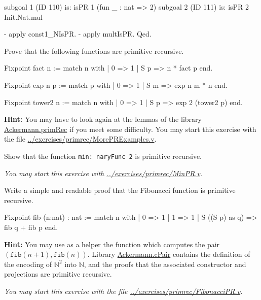 \begin{Coqanswer}
subgoal 1 (ID 110) is:
 isPR 1 (fun _ : nat => 2)
subgoal 2 (ID 111) is:
 isPR 2 Init.Nat.mul
\end{Coqanswer}

 \begin{Coqsrc}
  - apply const1_NIsPR.
  - apply multIsPR.
Qed.
\end{Coqsrc}

\begin{exercise}
Prove that the following functions are primitive recursive. 

\begin{Coqsrc}
Fixpoint fact n :=
  match n with 
          | 0 => 1
          | S p  => n * fact p
  end.

Fixpoint exp n p :=
  match p with
  | 0 => 1
  | S m =>  exp n m * n
  end.

Fixpoint tower2 n :=
  match n with
  | 0 => 1
  | S p => exp 2 (tower2 p)
  end.
\end{Coqsrc}



\textbf{Hint:} You may have to look again at the lemmas of the library
\href{../theories/html/hydras.Ackermann.primRec.html}{Ackermann.primRec} if you meet some difficulty.
You may start this exercise with the file
\url{../exercises/primrec/MorePRExamples.v}.
\end{exercise}



\begin{exercise}
Show that the function \texttt{min: naryFunc\,2} is primitive
recursive.

\emph{You may start this exercise with
\url{../exercises/primrec/MinPR.v}.}

\end{exercise}


\begin{exercise}
Write a simple and readable proof that the Fibonacci function is primitive recursive.


\begin{Coqsrc}
Fixpoint fib (n:nat) : nat :=
  match n with
  | 0 => 1
  | 1 => 1
  | S ((S p) as q) => fib q + fib p
  end.
\end{Coqsrc}

\textbf{Hint:}  You may use as a helper the function which computes the pair 
$(\texttt{fib}(n+1),\texttt{fib}(n))$. 
Library \href{../theories/html/hydras.Ackermann.cPair.html}{Ackermann.cPair} contains
the definition of the encoding of $\mathbb{N}^2$ into $\mathbb{N}$, and the proofs that 
the associated constructor and projections are primitive recursive.


\emph{You may start this exercise with the file
\url{../exercises/primrec/FibonacciPR.v}.}

\end{exercise}


